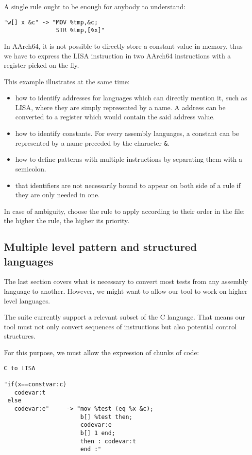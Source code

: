A single rule ought to be enough for anybody to understand:
\begin{verbatim}
"w[] x &c" -> "MOV %tmp,&c;
               STR %tmp,[%x]"
\end{verbatim}

In AArch64, it is not possible to directly store a constant value in memory,
thus we have to express the LISA instruction in two AArch64 instructions
with a register picked on the fly.

This example illustrates at the same time:
\begin{itemize}
\item how to identify addresses for languages which can directly mention it,
such as LISA, where they are simply represented by a name. A address can
be converted to a register which would contain the said address value.
\item how to identify constants. For every assembly languages, a constant can be
represented by a name preceded by the character \verb+&+.
\item how to define patterns with multiple instructions by separating them
with a semicolon.
\item that identifiers are not necessarily bound to appear on both side of
a rule if they are only needed in one.
\end{itemize}

In case of ambiguity, \jingle{} choose the rule to apply according to their order
in the file: the higher the rule, the higher its priority.

\subsection{Multiple level pattern and structured languages}
The last section covers what is necessary to convert most tests from any assembly language
to another. However, we might want to allow our tool to work on higher level languages.

The suite currently support a relevant subset of the C language.
That means our tool must not only convert sequences of instructions but also
potential control structures.

For this purpose, we must allow the expression of chunks of code:

\begin{verbatim}
C to LISA

"if(x==constvar:c)
   codevar:t
 else
   codevar:e"     -> "mov %test (eq %x &c);
                      b[] %test then;
                      codevar:e
                      b[] 1 end;
                      then : codevar:t
                      end :"
\end{verbatim}


